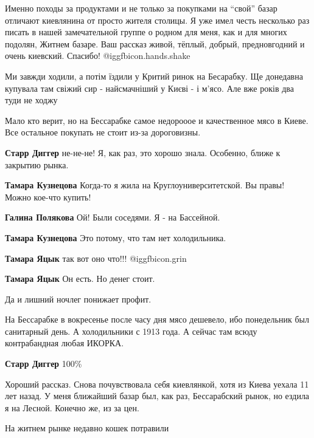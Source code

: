 \begin{itemize}

Именно походы за продуктами и не только за покупками на \enquote{свой} базар отличают
киевлянина от просто жителя столицы. Я уже имел честь несколько раз писать в
нашей замечательной группе о родном для меня, как и для многих подолян, Житнем
базаре. Ваш рассказ живой, тёплый, добрый, предновгодний и очень киевский.
Спасибо! @igg{fbicon.hands.shake} 


Ми завжди ходили, а потім їздили у Критий ринок на Бесарабку. Ще донедавна
купувала там свіжий сир - найсмачніший у Києві - і м'ясо. Але вже років два
туди не ходжу


Мало кто верит, но на Бессарабке самое недорооое и качественное мясо в Киеве.
Все остальное покупать не стоит из-за дороговизны.

\begin{itemize} %
\textbf{Старр Диггер} не-не-не! Я, как раз, это хорошо знала. Особенно, ближе к закрытию рынка.

\begin{itemize} %
\textbf{Тамара Кузнецова} Когда-то я жила на Круглоуниверситетской. Вы правы! Можно кое-что купить!

\textbf{Галина Полякова} Ой! Были соседями. Я - на Бассейной.

\textbf{Тамара Кузнецова} Это потому, что там нет холодильника.

\textbf{Тамара Яцык} так вот оно что!!! @igg{fbicon.grin} 

\textbf{Тамара Яцык} Он есть. Но денег стоит.

Да и лишний ночлег понижает профит.

\end{itemize} %


На Бессарабке в вокресенье после часу дня мясо дешевело, ибо понедельник был
санитарный день. А холодильники с 1913 года. А сейчас там всюду контрабандная
любая ИКОРКА.

\textbf{Старр Диггер}
100\%

\end{itemize} %


Хороший рассказ. Снова почувствовала себя киевлянкой, хотя из Киева уехала 11
лет назад. У меня ближайший базар был, как раз, Бессарабский рынок, но ездила я
на Лесной. Конечно же, из за цен.

На житнем рынке недавно кошек потравили

\end{itemize} %
